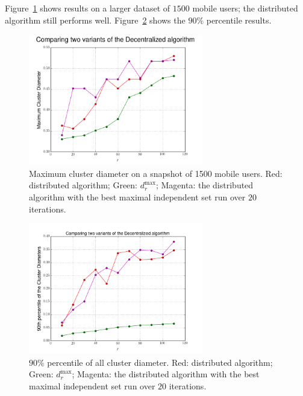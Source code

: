 Figure~\ref{fig:large} shows results on a larger dataset of $1500$
mobile users; the distributed algorithm still performs well. Figure~\ref{fig:large-90} shows the $90\%$ percentile results.  


\begin{figure}[h]
\begin{center}
\includegraphics[width=3in]{figs/cars1500_4Approx.png}
\caption{Maximum cluster diameter on a snapshot of 1500 mobile users. Red: distributed algorithm; Green: $d_{r}^{\max}$; Magenta: the distributed algorithm with the best maximal independent set run over $20$ iterations.}\label{fig:large}
\end{center}
\end{figure}

\begin{figure}[h]
\begin{center}
\includegraphics[width=3in]{figs/90thpercentile_1500cars.png}
\caption{$90\%$ percentile of all cluster diameter. 
Red: distributed algorithm; Green: $d_{r}^{\max}$; Magenta: the distributed algorithm with the best maximal independent set run over $20$ iterations.}\label{fig:large-90}
\end{center}
\end{figure}



